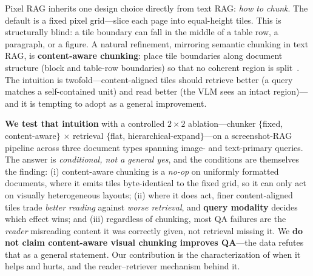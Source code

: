 \documentclass[11pt]{article}
\begin{document}
Pixel RAG inherits one design choice directly from text RAG: \emph{how to chunk}. The default is a
fixed pixel grid---slice each page into equal-height tiles. This is structurally blind: a tile boundary
can fall in the middle of a table row, a paragraph, or a figure. A natural refinement, mirroring
semantic chunking in text RAG, is \textbf{content-aware chunking}: place tile boundaries along document
structure (block and table-row boundaries) so that no coherent region is split~\citep{m3docdep,colchunk}.
The intuition is twofold---content-aligned tiles should retrieve better (a query matches a self-contained
unit) and read better (the VLM sees an intact region)---and it is tempting to adopt as a general
improvement.

\textbf{We test that intuition} with a controlled $2\times2$ ablation---chunker $\{$fixed,
content-aware$\}$ $\times$ retrieval $\{$flat, hierarchical-expand$\}$---on a screenshot-RAG pipeline
across three document types spanning image- and text-primary queries. The answer is \emph{conditional,
not a general yes}, and the conditions are themselves the finding: (i) content-aware chunking is a
\emph{no-op} on uniformly formatted documents, where it emits tiles byte-identical to the fixed grid, so
it can only act on visually heterogeneous layouts; (ii) where it does act, finer content-aligned tiles
trade \emph{better reading} against \emph{worse retrieval}, and \textbf{query modality} decides which
effect wins; and (iii) regardless of chunking, most QA failures are the \emph{reader} misreading content
it was correctly given, not retrieval missing it. We \textbf{do not claim content-aware visual chunking
improves QA}---the data refutes that as a general statement. Our contribution is the characterization of
when it helps and hurts, and the reader--retriever mechanism behind it.
\end{document}
